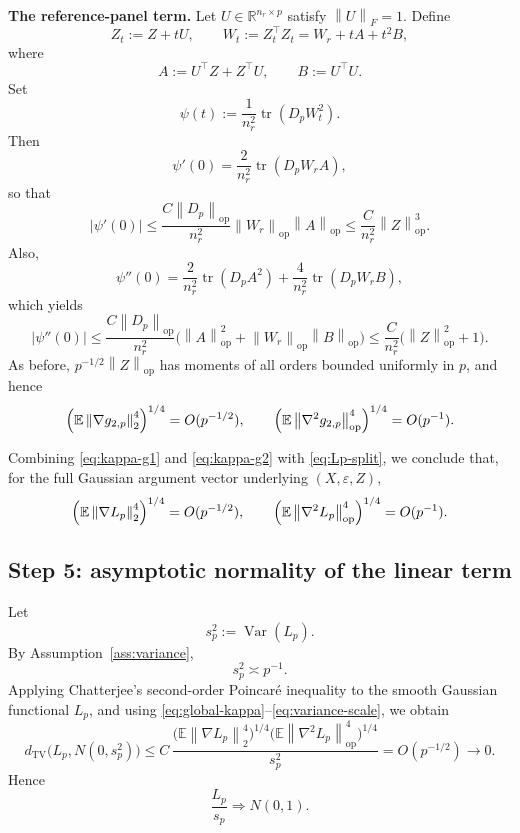 \documentclass[11pt]{article}
\theoremstyle{definition}
\newcommand{\R}{\mathbb{R}}
\newcommand{\E}{\mathbb{E}}
\newcommand{\Var}{\operatorname{Var}}
\newcommand{\tr}{\operatorname{tr}}
\newcommand{\op}{\mathrm{op}}
\newcommand{\TV}{\mathrm{TV}}
\newcommand{\1}{\mathbf{1}}
\newcommand{\norm}[1]{\left\lVert #1 \right\rVert}
\newcommand{\abs}[1]{\left\lvert #1 \right\rvert}
\newcommand{\dto}{\Longrightarrow}
\begin{document}
\medskip
\noindent
\textbf{The reference-panel term.}
Let $U\in\R^{n_r\times p}$ satisfy $\norm{U}_F=1$. Define
\[
 Z_t:=Z+tU,
 \qquad
 W_t:=Z_t^\top Z_t=W_r+tA+t^2B,
\]
where
\[
 A:=U^\top Z+Z^\top U,
 \qquad
 B:=U^\top U.
\]
Set
\[
 \psi(t):=\frac1{n_r^2}\tr(D_pW_t^2).
\]
Then
\[
 \psi'(0)=\frac{2}{n_r^2}\tr(D_pW_rA),
\]
so that
\begin{equation}\label{eq:first-derivative-g2}
 \abs{\psi'(0)}
 \le \frac{C\norm{D_p}_{\op}}{n_r^2}\norm{W_r}_{\op}\norm{A}_{\op}
 \le \frac{C}{n_r^2}\norm{Z}_{\op}^3.
\end{equation}
Also,
\[
 \psi''(0)=\frac{2}{n_r^2}\tr(D_pA^2)+\frac{4}{n_r^2}\tr(D_pW_rB),
\]
which yields
\begin{equation}\label{eq:second-derivative-g2}
 \abs{\psi''(0)}
 \le \frac{C\norm{D_p}_{\op}}{n_r^2}\bigl(\norm{A}_{\op}^2+\norm{W_r}_{\op}\norm{B}_{\op}\bigr)
 \le \frac{C}{n_r^2}\bigl(\norm{Z}_{\op}^2+1\bigr).
\end{equation}
As before, $p^{-1/2}\norm{Z}_{\op}$ has moments of all orders bounded uniformly in $p$, and hence
\begin{equation}\label{eq:kappa-g2}
 \Bigl(\E\norm{\nabla g_{2,p}}_2^4\Bigr)^{1/4}=O(p^{-1/2}),
 \qquad
 \Bigl(\E\norm{\nabla^2 g_{2,p}}_{\op}^4\Bigr)^{1/4}=O(p^{-1}).
\end{equation}

Combining \eqref{eq:kappa-g1} and \eqref{eq:kappa-g2} with \eqref{eq:Lp-split}, we conclude that, for the full Gaussian argument vector underlying $(X,\varepsilon,Z)$,
\begin{equation}\label{eq:global-kappa}
 \Bigl(\E\norm{\nabla L_p}_2^4\Bigr)^{1/4}=O(p^{-1/2}),
 \qquad
 \Bigl(\E\norm{\nabla^2 L_p}_{\op}^4\Bigr)^{1/4}=O(p^{-1}).
\end{equation}

\subsection*{Step 5: asymptotic normality of the linear term}

Let
\[
 s_p^2:=\Var(L_p).
\]
By Assumption~\ref{ass:variance},
\begin{equation}\label{eq:variance-scale}
 s_p^2\asymp p^{-1}.
\end{equation}
Applying Chatterjee's second-order Poincar\'e inequality to the smooth Gaussian functional $L_p$, and using \eqref{eq:global-kappa}--\eqref{eq:variance-scale}, we obtain
\[
 d_{\TV}\bigl(L_p,N(0,s_p^2)\bigr)
 \le C\,\frac{\bigl(\E\norm{\nabla L_p}_2^4\bigr)^{1/4}\bigl(\E\norm{\nabla^2 L_p}_{\op}^4\bigr)^{1/4}}{s_p^2}
 =O(p^{-1/2})\to 0.
\]
Hence
\begin{equation}\label{eq:Lp-clt}
 \frac{L_p}{s_p}\dto N(0,1).
\end{equation}
\end{document}
